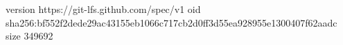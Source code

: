 version https://git-lfs.github.com/spec/v1
oid sha256:bf552f2dede29ac43155eb1066c717cb2d0ff3d55ea928955e1300407f62aadc
size 349692
